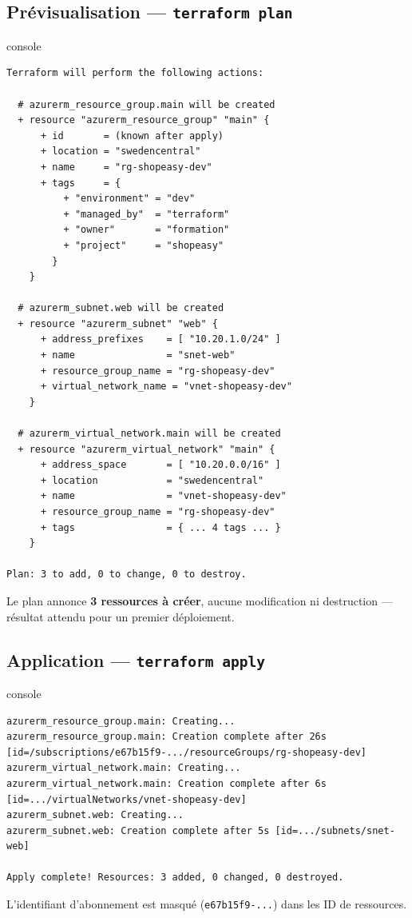 \documentclass[11pt,a4paper]{article}
\newcommand{\code}[1]{\texttt{#1}}
\begin{document}
\subsection{Prévisualisation — \code{terraform plan}}
\begin{codebox}{console}
\begin{Verbatim}
Terraform will perform the following actions:

  # azurerm_resource_group.main will be created
  + resource "azurerm_resource_group" "main" {
      + id       = (known after apply)
      + location = "swedencentral"
      + name     = "rg-shopeasy-dev"
      + tags     = {
          + "environment" = "dev"
          + "managed_by"  = "terraform"
          + "owner"       = "formation"
          + "project"     = "shopeasy"
        }
    }

  # azurerm_subnet.web will be created
  + resource "azurerm_subnet" "web" {
      + address_prefixes    = [ "10.20.1.0/24" ]
      + name                = "snet-web"
      + resource_group_name = "rg-shopeasy-dev"
      + virtual_network_name = "vnet-shopeasy-dev"
    }

  # azurerm_virtual_network.main will be created
  + resource "azurerm_virtual_network" "main" {
      + address_space       = [ "10.20.0.0/16" ]
      + location            = "swedencentral"
      + name                = "vnet-shopeasy-dev"
      + resource_group_name = "rg-shopeasy-dev"
      + tags                = { ... 4 tags ... }
    }

Plan: 3 to add, 0 to change, 0 to destroy.
\end{Verbatim}
\end{codebox}
Le plan annonce \textbf{3 ressources à créer}, aucune modification ni destruction — résultat attendu pour un
premier déploiement.

\subsection{Application — \code{terraform apply}}
\begin{codebox}{console}
\begin{Verbatim}
azurerm_resource_group.main: Creating...
azurerm_resource_group.main: Creation complete after 26s [id=/subscriptions/e67b15f9-.../resourceGroups/rg-shopeasy-dev]
azurerm_virtual_network.main: Creating...
azurerm_virtual_network.main: Creation complete after 6s [id=.../virtualNetworks/vnet-shopeasy-dev]
azurerm_subnet.web: Creating...
azurerm_subnet.web: Creation complete after 5s [id=.../subnets/snet-web]

Apply complete! Resources: 3 added, 0 changed, 0 destroyed.
\end{Verbatim}
\end{codebox}
{\small L'identifiant d'abonnement est masqué (\code{e67b15f9-...}) dans les ID de ressources.}
\end{document}
